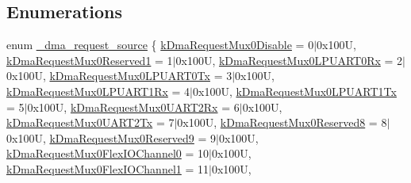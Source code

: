 \subsection*{Enumerations}
\begin{DoxyCompactItemize}
\item 
enum \mbox{\hyperlink{group__edma__request_gafd16b7227cfdebb996c941d293ddd600}{\+\_\+dma\+\_\+request\+\_\+source}} \{ \newline
\mbox{\hyperlink{group__edma__request_ggafd16b7227cfdebb996c941d293ddd600aadd4a4e2b949beeb891c555e14334928}{k\+Dma\+Request\+Mux0\+Disable}} = 0$\vert$0x100U, 
\mbox{\hyperlink{group__edma__request_ggafd16b7227cfdebb996c941d293ddd600a85eeff0b46973f2b0ae4daf813462d5a}{k\+Dma\+Request\+Mux0\+Reserved1}} = 1$\vert$0x100U, 
\mbox{\hyperlink{group__edma__request_ggafd16b7227cfdebb996c941d293ddd600a59ec211754ebff8341c9877df8f9bd8f}{k\+Dma\+Request\+Mux0\+L\+P\+U\+A\+R\+T0\+Rx}} = 2$\vert$0x100U, 
\mbox{\hyperlink{group__edma__request_ggafd16b7227cfdebb996c941d293ddd600aed990911c11b6bd2072793fbac8a30ec}{k\+Dma\+Request\+Mux0\+L\+P\+U\+A\+R\+T0\+Tx}} = 3$\vert$0x100U, 
\newline
\mbox{\hyperlink{group__edma__request_ggafd16b7227cfdebb996c941d293ddd600a9168459d074d7d5db188818f924bb86a}{k\+Dma\+Request\+Mux0\+L\+P\+U\+A\+R\+T1\+Rx}} = 4$\vert$0x100U, 
\mbox{\hyperlink{group__edma__request_ggafd16b7227cfdebb996c941d293ddd600a6feb99db2005544024ef3614c085522b}{k\+Dma\+Request\+Mux0\+L\+P\+U\+A\+R\+T1\+Tx}} = 5$\vert$0x100U, 
\mbox{\hyperlink{group__edma__request_ggafd16b7227cfdebb996c941d293ddd600abdb66898880cb33791cb9fe05a21cd7e}{k\+Dma\+Request\+Mux0\+U\+A\+R\+T2\+Rx}} = 6$\vert$0x100U, 
\mbox{\hyperlink{group__edma__request_ggafd16b7227cfdebb996c941d293ddd600a099e0ce02e437caea2491898886f0905}{k\+Dma\+Request\+Mux0\+U\+A\+R\+T2\+Tx}} = 7$\vert$0x100U, 
\newline
\mbox{\hyperlink{group__edma__request_ggafd16b7227cfdebb996c941d293ddd600a019afe7b6f7294925b38542a3ef33354}{k\+Dma\+Request\+Mux0\+Reserved8}} = 8$\vert$0x100U, 
\mbox{\hyperlink{group__edma__request_ggafd16b7227cfdebb996c941d293ddd600aa764337ee6b41dfd828043184373684f}{k\+Dma\+Request\+Mux0\+Reserved9}} = 9$\vert$0x100U, 
\mbox{\hyperlink{group__edma__request_ggafd16b7227cfdebb996c941d293ddd600ac8fad0c17c25ced4bf6b1789130f9734}{k\+Dma\+Request\+Mux0\+Flex\+I\+O\+Channel0}} = 10$\vert$0x100U, 
\mbox{\hyperlink{group__edma__request_ggafd16b7227cfdebb996c941d293ddd600a295eb4c6412838f4fce0d7f2312c696f}{k\+Dma\+Request\+Mux0\+Flex\+I\+O\+Channel1}} = 11$\vert$0x100U, 
\newline

\end{DoxyCompactItemize}
